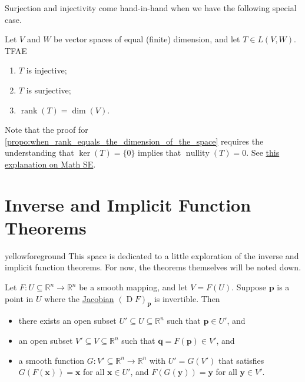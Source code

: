 \documentclass[notoc,notitlepage]{tufte-book}
\DeclareMathOperator{\nullity}{nullity}
\DeclareMathOperator{\rank}{rank}
\DeclareMathOperator{\D}{D}
\begin{document}
Surjection and injectivity come hand-in-hand when
we have the following special case.

\begin{propo}\label{propo:when_rank_equals_the_dimension_of_the_space}
  Let $V$ and $W$ be vector spaces of equal (finite) dimension,
  and let $T \in L(V, W)$. TFAE
  \begin{enumerate}
    \item $T$ is injective;
    \item $T$ is surjective;
    \item $\rank(T) = \dim(V)$.
  \end{enumerate}
\end{propo}

Note that the proof for \cref{propo:when_rank_equals_the_dimension_of_the_space}
requires the understanding that $\ker(T) = \{ 0 \}$ implies that $\nullity(T) = 0$.
See \href{https://math.stackexchange.com/questions/664594/why-mathbf0-has-dimension-zero}{this explanation on Math SE}.


\section{Inverse and Implicit Function Theorems}%
\label{sec:inverse_and_implicit_function_theorems}

\begin{quotebox}{yellow}{foreground}
  This space is dedicated to a little exploration of the inverse and implicit
  function theorems. For now, the theorems themselves will be noted down.
\end{quotebox}

\begin{thm}\label{thm:inverse_function_theorem}
  Let $F : U \subseteq \mathbb{R}^n \to \mathbb{R}^n$ be a smooth mapping, and
  let $V = F(U)$. Suppose $\bm{p}$ is a point in $U$ where the
  \hyperref[defn:differential]{Jacobian} $(\D F)_{\bm{p}}$ is invertible. Then
  \begin{itemize}
    \item there exists an open subset $U' \subseteq U \subseteq \mathbb{R}^n$
      such that $\bm{p} \in U'$, and
    \item an open subset $V' \subseteq V \subseteq \mathbb{R}^n$ such that
      $\bm{q} = F(\bm{p}) \in V'$, and
    \item a smooth function $G : V' \subseteq \mathbb{R}^n \to \mathbb{R}^n$
      with $U' = G(V')$ that satisfies $G(F(\bm{x})) = \bm{x}$ for all $\bm{x}
      \in U'$, and $F(G(\bm{y})) = \bm{y}$ for all $\bm{y} \in V'$.
  \end{itemize}
\end{thm}
\end{document}
